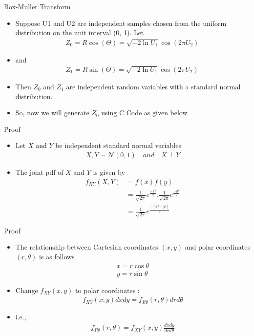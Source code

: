 \documentclass{beamer}
\begin{document}
\begin{frame}{Box-Muller Transform}
  \begin{itemize}
  \item Suppose U1 and U2 are independent samples chosen from the uniform distribution on the unit interval (0, 1). Let
  \begin{align}
  	Z_0 = R \cos(\Theta) =\sqrt{-2 \ln U_1} \cos(2 \pi U_2)\,
  \end{align}
  \item  and
  \begin{align}
  	Z_1 = R \sin(\Theta) =\sqrt{-2 \ln U_1} \cos(2 \pi U_2)\, 
  \end{align}
  \item Then $Z_0$ and $Z_1$ are independent random variables with a standard normal distribution.
  \item So, now we will generate $Z_0$ using C Code as given below 
  \end{itemize}
\end{frame}

\begin{frame}{Proof}
  \begin{itemize}
  \item Let $X$ and $Y$ be independent standard normal variables 
  \begin{align}
  	X,Y \sim \mathcal{N}(0,1) \quad and \quad X\perp Y
  \end{align}
  \item The joint pdf of $X$ and $Y$ is given by 
  \begin{align}
  	f_{XY}(X,Y) &= f(x)f(y)\\
  	&= \frac{1}{\sqrt{2\pi}}e^{\frac{-x^2}{2}}.\frac{1}{\sqrt{2\pi}}e^{\frac{-y^2}{2}}\\
  	&= \frac{1}{\sqrt{2\pi}}e^{\frac{-(x^2+y^2)}{2}}
  \end{align}
  \end{itemize}
\end{frame}

\begin{frame}{Proof}
  \begin{itemize} 
  \item The relationship between Cartesian coordinates $(x,y)$ and polar coordinates $(r,\theta)$ is as follows 
  \begin{align}
  	x=r\cos\theta \\
  	y=r\sin\theta
  \end{align}
  \item Change $f_{XY}(x,y)$ to polar coordinates :
  \begin{align}
  	f_{XY}(x,y) dxdy = f_{R\theta}(r,\theta) drd\theta
  \end{align}
  \item i.e.,
  \begin{align}
  	f_{R\theta}(r,\theta) = f_{XY}(x,y) \frac{dxdy}{drd\theta}
  \end{align}
  \end{itemize}
\end{frame}
\end{document}
